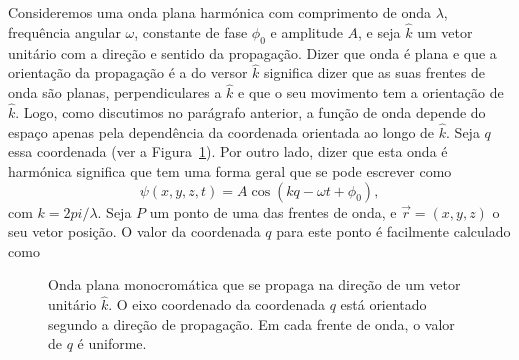 Consideremos uma onda plana harmónica com comprimento de onda $\lambda$,
frequência angular $\omega$, constante de fase $\phi_0$ e amplitude $A$, e seja
$\hat k$ um vetor unitário com a direção e sentido da propagação. Dizer que
onda é plana e que a orientação da propagação é a do versor $\hat k$ significa
dizer que as suas frentes de onda são planas, perpendiculares a $\hat k$ e que
o seu movimento tem a orientação de $\hat k$. Logo, como discutimos no parágrafo
anterior, a função de onda depende do espaço apenas pela dependência da
coordenada orientada ao longo de $\hat k$. Seja $q$ essa coordenada (ver a
Figura~\ref{fig:f050}).  Por outro lado, dizer que esta onda é harmónica
significa que tem uma forma geral que se pode escrever como
\begin{equation}\label{eq:eq0}
  \psi(x,y,z,t)=A\cos\left(kq-\omega t+\phi_0\right),
\end{equation}
com $k=2pi/\lambda$. Seja $P$ um ponto de uma das frentes de onda, e
$\vec r=(x,y,z)$ o seu vetor posição. O valor da coordenada $q$ para este ponto
é facilmente calculado como
\begin{figure}[htb]
  {\centering
    \par
  }
  \caption{\label{fig:f050}Onda plana monocromática que se propaga na direção de
    um vetor unitário $\hat k$. O eixo coordenado da coordenada $q$ está
    orientado segundo a direção de propagação. Em cada frente de onda, o valor
  de $q$ é uniforme.}
\end{figure}
